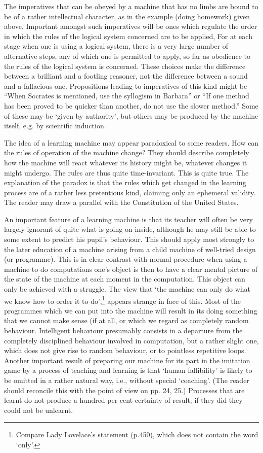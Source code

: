 \documentclass[10pt]{article} %
\begin{document}
The imperatives that can be obeyed by a machine that has no limbs are bound to be of a rather intellectual character, as in the example (doing homework) given above. Important amongst such imperatives will be ones which regulate the order in which the rules of the logical system concerned are to be applied, For at each stage when one is using a logical system, there is a very large number of alternative steps, any of which one is permitted to apply, so far as obedience to the rules of the logical system is concerned. These choices make the difference between a brilliant and a footling reasoner, not the difference between a sound and a fallacious one. Propositions leading to imperatives of this kind might be ``When Socrates is mentioned, use the syllogism in Barbara'' or ``If one method has been proved to be quicker than another, do not use the slower method.'' Some of these may be `given by authority', but others may be produced by the machine itself, e.g. by scientific induction.

The idea of a learning machine may appear paradoxical to some readers. How can the rules of operation of the machine change? They should describe completely how the machine will react whatever its history might be, whatever changes it might undergo. The rules are thus quite time-invariant. This is quite true. The explanation of the paradox is that the rules which get changed in the learning process are of a rather less pretentious kind, claiming only an ephemeral validity. The reader may draw a parallel with the Constitution of the United States.

An important feature of a learning machine is that its teacher will often be very largely ignorant of quite what is going on inside, although he may still be able to some extent to predict his pupil's behaviour. This should apply most strongly to the later education of a machine arising from a child machine of well-tried design (or programme). This is in clear contrast with normal procedure when using a machine to do computations one's object is then to have a clear mental picture of the state of the machine at each moment in the computation. This object can only be achieved with a struggle. The view that `the machine can only do what we know how to order it to do',\footnote{\normalfont\tiny Compare Lady Lovelace's statement (p.450), which does not contain the word `only'.} appears strange in face of this. Most of the programmes which we can put into the machine will result in its doing something that we cannot make sense (if at all, or which we regard as completely random behaviour. Intelligent behaviour presumably consists in a departure from the completely disciplined behaviour involved in computation, but a rather slight one, which does not give rise to random behaviour, or to pointless repetitive loops. Another important result of preparing our machine for its part in the imitation game by a process of teaching and learning is that `human fallibility' is likely to be omitted in a rather natural way, i.e., without special `coaching'. (The reader should reconcile this with the point of view on pp. 24, 25.) Processes that are learnt do not produce a hundred per cent certainty of result; if they did they could not be unlearnt.
\end{document}
